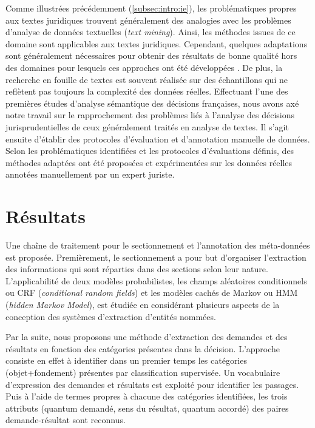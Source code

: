 Comme illustrées précédemment (\ref{subsec:intro:ie}), les problématiques propres aux textes juridiques trouvent généralement des analogies avec les problèmes d'analyse de données textuelles (\textit{text mining}). Ainsi, les méthodes issues de ce domaine sont applicables aux textes juridiques. Cependant, quelques adaptations sont généralement nécessaires pour obtenir des résultats de bonne qualité hors des domaines pour lesquels ces approches ont été développées \citep{Waltl2016lexia}. De plus, la recherche en fouille de textes est souvent réalisée sur des échantillons qui ne reflètent pas toujours la complexité des données réelles. Effectuant l'une des premières études d'analyse sémantique des décisions françaises, nous avons axé notre travail sur le rapprochement des problèmes liés à l'analyse des décisions jurisprudentielles de ceux généralement traités en analyse de textes. Il s'agit ensuite d'établir des protocoles d'évaluation et d'annotation manuelle de données. Selon les problématiques identifiées et les protocoles d'évaluations définis, des méthodes adaptées ont été proposées et expérimentées sur les données réelles annotées manuellement par un expert juriste.

\section{Résultats}
\label{sec:intro:résultats}
Une chaîne de traitement pour le sectionnement et l'annotation des méta-données est proposée. Premièrement, le sectionnement a pour but d'organiser l'extraction des informations qui sont réparties dans des sections selon leur nature. L'applicabilité de deux modèles probabilistes, les champs aléatoires conditionnels ou CRF (\textit{conditional random fields}) et les modèles cachés de Markov ou HMM (\textit{hidden Markov Model}), est étudiée en considérant plusieurs aspects de la conception des systèmes d'extraction d'entités nommées.  

Par la suite, nous proposons une méthode d'extraction des demandes et des résultats en fonction des catégories présentes dans la décision. L'approche consiste en effet à identifier dans un premier temps les catégories (objet+fondement) présentes par classification supervisée. Un vocabulaire d'expression des demandes et résultats est exploité pour identifier les passages. Puis à l'aide de termes propres à chacune des catégories identifiées, les trois attributs (quantum demandé, sens du résultat, quantum accordé) des paires demande-résultat sont reconnus. 


